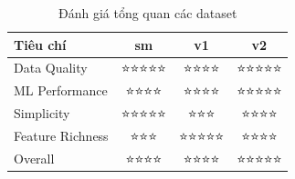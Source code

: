 \documentclass[12pt,a4paper]{article}
\begin{document}
\begin{table}[H]
\centering
\begin{tabular}{lccc}
\toprule
\textbf{Tiêu chí} & \textbf{sm} & \textbf{v1} & \textbf{v2}\\
\midrule
Data Quality & ⭐⭐⭐⭐⭐ & ⭐⭐⭐⭐ & ⭐⭐⭐⭐⭐\\
ML Performance & ⭐⭐⭐⭐ & ⭐⭐⭐⭐ & ⭐⭐⭐⭐⭐\\
Simplicity & ⭐⭐⭐⭐⭐ & ⭐⭐⭐ & ⭐⭐⭐⭐\\
Feature Richness & ⭐⭐⭐ & ⭐⭐⭐⭐⭐ & ⭐⭐⭐⭐\\
Overall & ⭐⭐⭐⭐ & ⭐⭐⭐⭐ & ⭐⭐⭐⭐⭐\\
\bottomrule
\end{tabular}
\caption{Đánh giá tổng quan các dataset}
\end{table}



\end{document}
